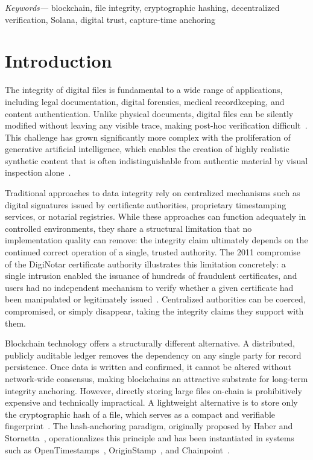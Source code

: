 \documentclass[11pt,a4paper]{article}
\providecommand{\keywords}[1]{\vspace{0.5em}\noindent\textit{Keywords---} #1}
\begin{document}
\keywords{blockchain, file integrity, cryptographic hashing, decentralized
verification, Solana, digital trust, capture-time anchoring}

\section{Introduction}
\label{sec:introduction}

The integrity of digital files is fundamental to a wide range of
applications, including legal documentation, digital forensics, medical
recordkeeping, and content authentication. Unlike physical documents,
digital files can be silently modified without leaving any visible trace,
making post-hoc verification difficult~\cite{menezes1996handbook}. This
challenge has grown significantly more complex with the proliferation of
generative artificial intelligence, which enables the creation of highly
realistic synthetic content that is often indistinguishable from authentic
material by visual inspection alone~\cite{rossler2019faceforensics}.

Traditional approaches to data integrity rely on centralized mechanisms
such as digital signatures issued by certificate authorities, proprietary
timestamping services, or notarial registries. While these approaches can
function adequately in controlled environments, they share a structural
limitation that no implementation quality can remove: the integrity claim
ultimately depends on the continued correct operation of a single, trusted
authority. The 2011 compromise of the DigiNotar certificate authority
illustrates this limitation concretely: a single intrusion enabled the
issuance of hundreds of fraudulent certificates, and users had no
independent mechanism to verify whether a given certificate had been
manipulated or legitimately issued~\cite{prins2011diginotar}. Centralized
authorities can be coerced, compromised, or simply disappear, taking the
integrity claims they support with them.

Blockchain technology offers a structurally different alternative. A
distributed, publicly auditable ledger removes the dependency on any
single party for record persistence. Once data is written and confirmed,
it cannot be altered without network-wide consensus, making blockchains
an attractive substrate for long-term integrity anchoring. However,
directly storing large files on-chain is prohibitively expensive and
technically impractical. A lightweight alternative is to store only the
cryptographic hash of a file, which serves as a compact and verifiable
fingerprint~\cite{nakamoto2008bitcoin}. The hash-anchoring paradigm,
originally proposed by Haber and Stornetta~\cite{haber1991timestamp},
operationalizes this principle and has been instantiated in systems such
as OpenTimestamps~\cite{todd2016ots}, OriginStamp~\cite{gipp2015originstamp},
and Chainpoint~\cite{vaughan2016chainpoint}.
\end{document}
